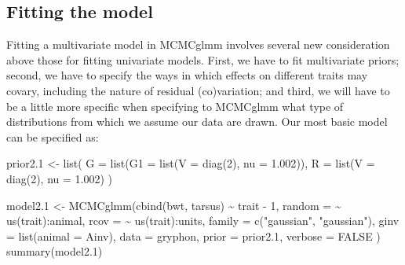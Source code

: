 \documentclass[
  12pt,
]{book}
\newenvironment{Shaded}{\begin{snugshade}}{\end{snugshade}}
\newcommand{\AttributeTok}[1]{\textcolor[rgb]{0.77,0.63,0.00}{#1}}
\newcommand{\ConstantTok}[1]{\textcolor[rgb]{0.00,0.00,0.00}{#1}}
\newcommand{\DecValTok}[1]{\textcolor[rgb]{0.00,0.00,0.81}{#1}}
\newcommand{\FloatTok}[1]{\textcolor[rgb]{0.00,0.00,0.81}{#1}}
\newcommand{\FunctionTok}[1]{\textcolor[rgb]{0.00,0.00,0.00}{#1}}
\newcommand{\NormalTok}[1]{#1}
\newcommand{\OtherTok}[1]{\textcolor[rgb]{0.56,0.35,0.01}{#1}}
\newcommand{\SpecialCharTok}[1]{\textcolor[rgb]{0.00,0.00,0.00}{#1}}
\newcommand{\StringTok}[1]{\textcolor[rgb]{0.31,0.60,0.02}{#1}}
\begin{document}
\hypertarget{fitting-the-model}{%
\subsection{Fitting the model}\label{fitting-the-model}}

Fitting a multivariate model in MCMCglmm involves several new consideration above those for fitting univariate models. First, we have to fit multivariate priors; second, we have to specify the ways in which effects on different traits may covary, including the nature of residual (co)variation; and third, we will have to be a little more specific when specifying to MCMCglmm what type of distributions from which we assume our data are drawn. Our most basic model can be specified as:

\begin{Shaded}
\begin{Highlighting}[]
\NormalTok{prior2}\FloatTok{.1} \OtherTok{\textless{}{-}} \FunctionTok{list}\NormalTok{(}
  \AttributeTok{G =} \FunctionTok{list}\NormalTok{(}\AttributeTok{G1 =} \FunctionTok{list}\NormalTok{(}\AttributeTok{V =} \FunctionTok{diag}\NormalTok{(}\DecValTok{2}\NormalTok{), }\AttributeTok{nu =} \FloatTok{1.002}\NormalTok{)),}
  \AttributeTok{R =} \FunctionTok{list}\NormalTok{(}\AttributeTok{V =} \FunctionTok{diag}\NormalTok{(}\DecValTok{2}\NormalTok{), }\AttributeTok{nu =} \FloatTok{1.002}\NormalTok{)}
\NormalTok{)}

\NormalTok{model2}\FloatTok{.1} \OtherTok{\textless{}{-}} \FunctionTok{MCMCglmm}\NormalTok{(}\FunctionTok{cbind}\NormalTok{(bwt, tarsus) }\SpecialCharTok{\textasciitilde{}}\NormalTok{ trait }\SpecialCharTok{{-}} \DecValTok{1}\NormalTok{,}
  \AttributeTok{random =} \SpecialCharTok{\textasciitilde{}} \FunctionTok{us}\NormalTok{(trait)}\SpecialCharTok{:}\NormalTok{animal,}
  \AttributeTok{rcov =} \SpecialCharTok{\textasciitilde{}} \FunctionTok{us}\NormalTok{(trait)}\SpecialCharTok{:}\NormalTok{units,}
  \AttributeTok{family =} \FunctionTok{c}\NormalTok{(}\StringTok{"gaussian"}\NormalTok{, }\StringTok{"gaussian"}\NormalTok{),}
  \AttributeTok{ginv =} \FunctionTok{list}\NormalTok{(}\AttributeTok{animal =}\NormalTok{ Ainv),}
  \AttributeTok{data =}\NormalTok{ gryphon, }\AttributeTok{prior =}\NormalTok{ prior2}\FloatTok{.1}\NormalTok{, }\AttributeTok{verbose =} \ConstantTok{FALSE}
\NormalTok{)}
\FunctionTok{summary}\NormalTok{(model2}\FloatTok{.1}\NormalTok{)}
\end{Highlighting}
\end{Shaded}
\end{document}
